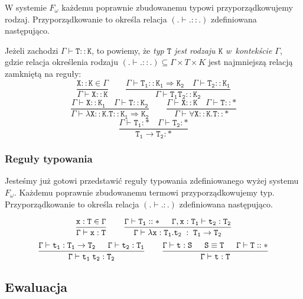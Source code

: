\documentclass[11pt,leqno]{article}
\begin{document}
W systemie $F_\omega$ każdemu poprawnie zbudowanemu typowi przyporządkowujemy rodzaj.
Przyporządkowanie to określa relacja $(.\vdash.::.)$ zdefiniowana następująco.

Jeżeli zachodzi $\mathtt{\Gamma \vdash T :: K}$, to powiemy, że
\emph {typ $\mathtt{T}$ jest rodzaju $\mathtt{K}$ w~kontekście $\mathtt{\Gamma}$}, gdzie
relacja określenia rodzaju $(.\vdash.::.) \subseteq \Gamma \times T \times K$
jest najmniejszą relacją zamkniętą na reguły:
	\[ \mathtt{
		\frac{X::K \in \Gamma}{\Gamma \vdash X::K}
		\qquad
		\frac{\Gamma \vdash T_1 :: K_{1} \Rightarrow K_{2} \hspace{1em} \Gamma \vdash T_2 :: K_{1}}{\Gamma \vdash T_1 T_2 :: K_{2}}}
	\]
	\[ \mathtt{
		\frac{\Gamma \vdash X :: K_1 \hspace{1em} \Gamma \vdash T :: K_2}{\Gamma \vdash \lambda X::K. T :: K_{1} \Rightarrow K_{2}}
		\qquad
		\frac{\Gamma \vdash X :: K \hspace{1em} \Gamma \vdash T :: \ast}{\Gamma \vdash \forall X::K. T :: \ast}}
	\]
	\[\mathtt{
		\frac{\Gamma \vdash T_1 : \ast \hspace{1em} \Gamma \vdash T_2 : \ast}{T_1 \rightarrow T_2 : \ast}}
	\]	


\subsubsection{Reguły typowania}

Jesteśmy już gotowi przedstawić reguły typowania zdefiniowanego wyżej systemu $F_\omega$.
Każdemu poprawnie zbudowanemu termowi przyporządkowujemy typ. Przyporządkowanie to określa relacja $(.\vdash.:.)$ zdefiniowana następująco.

	\[\mathtt{
		\frac{x:T \in \Gamma}{\Gamma \vdash x:T}
                \qquad
                \frac{\Gamma \vdash T_1::\ast \hspace{1.5em} \Gamma,x:T_1 \vdash t_2:T_2}{\Gamma \vdash \lambda x:T_1.t_2\;:\;T_1 \rightarrow T_2}}
	\]
	\[\mathtt{
		\frac{\Gamma \vdash t_1:T_1 \rightarrow T_2 \hspace{1.5em} \Gamma \vdash t_2:T_1}{ \Gamma \vdash t_1 \; t_2 : T_2}
                \qquad
                \frac{\Gamma \vdash t:S \hspace{1.5em} S \equiv T \hspace{1.5em} \Gamma \vdash T::\ast}{\Gamma \vdash t:T}}
	\]

\subsection{Ewaluacja}
\end{document}
